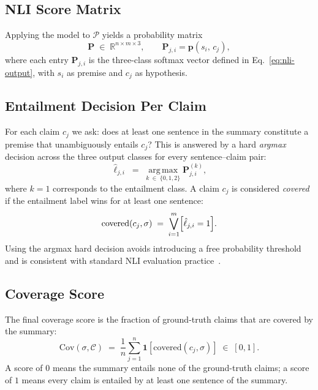 \documentclass[10pt,twocolumn]{article}
\begin{document}
\subsection{NLI Score Matrix}

Applying the model to $\mathcal{P}$ yields a probability matrix
%
\begin{equation}
  \mathbf{P} \;\in\; \mathbb{R}^{n \times m \times 3},
  \qquad
  \mathbf{P}_{j,i} = \mathbf{p}(s_i,\, c_j),
  \label{eq:score-matrix}
\end{equation}
%
where each entry $\mathbf{P}_{j,i}$ is the three-class softmax vector
defined in Eq.~\eqref{eq:nli-output}, with $s_i$ as premise and $c_j$ as
hypothesis.

\subsection{Entailment Decision Per Claim}

For each claim $c_j$ we ask: does at least one sentence in the summary
constitute a premise that unambiguously entails $c_j$? This is answered by
a hard \emph{argmax} decision across the three output classes for every
sentence–claim pair:
%
\begin{equation}
  \hat{\ell}_{j,i}
  \;=\;
  \operatorname*{arg\,max}_{k \;\in\; \{0,1,2\}}
  \mathbf{P}_{j,i}^{(k)},
  \label{eq:argmax}
\end{equation}
%
where $k=1$ corresponds to the entailment class. A claim $c_j$ is
considered \emph{covered} if the entailment label wins for at least one
sentence:
%
\begin{equation}
  \mathrm{covered}(c_j, \sigma)
  \;=\;
  \bigvee_{i=1}^{m}
  \Bigl[\hat{\ell}_{j,i} = 1\Bigr].
  \label{eq:covered}
\end{equation}
%
Using the argmax hard decision avoids introducing a free probability
threshold and is consistent with standard NLI evaluation
practice~\cite{bowman2015snli}.

\subsection{Coverage Score}

The final coverage score is the fraction of ground-truth claims that are
covered by the summary:
%
\begin{equation}
  \boxed{
  \mathrm{Cov}(\sigma, \mathcal{C})
  \;=\;
  \frac{1}{n}
  \sum_{j=1}^{n}
  \mathbf{1}\!\left[\mathrm{covered}(c_j, \sigma)\right]
  \;\in\; [0, 1].
  }
  \label{eq:coverage}
\end{equation}
%
A score of $0$ means the summary entails none of the ground-truth claims;
a score of $1$ means every claim is entailed by at least one sentence of
the summary.
\end{document}
